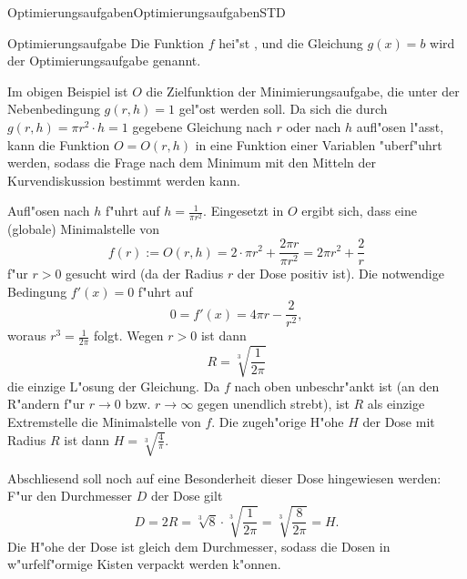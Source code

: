 \begin{MXContent}{Optimierungsaufgaben}{Optimierungsaufgaben}{STD}
\begin{MXInfo}{Optimierungsaufgabe}
Die Funktion $f$ hei"st , und die 
Gleichung $g(x) = b$ wird  der 
Optimierungsaufgabe genannt.
\end{MXInfo}

Im obigen Beispiel ist $O$ die Zielfunktion der Minimierungsaufgabe, die 
unter der Nebenbedingung $g(r, h) = 1$ gel"ost werden soll. Da sich die 
durch $g(r, h) = \pi r^2 \cdot h = 1$ gegebene Gleichung nach $r$ oder nach 
$h$ aufl"osen l"asst, kann die Funktion $O = O(r, h)$ in eine Funktion einer 
Variablen "uberf"uhrt werden, sodass die Frage nach dem Minimum mit den Mitteln 
der Kurvendiskussion %
bestimmt werden kann.

Aufl"osen nach $h$ f"uhrt auf $h = \frac{1}{\pi r^2}$. Eingesetzt in $O$ 
ergibt sich, dass eine (globale) Minimalstelle von
\[
f(r) := O(r, h) = 2 \cdot \pi r^2 + \frac{2 \pi r}{\pi r^2} %
 = 2 \pi r^2 + \frac{2}{r} %
\]
f"ur $r > 0$ gesucht wird (da der Radius $r$ der Dose positiv ist).
Die notwendige Bedingung $f'(x) = 0$ f"uhrt auf
\[
0 = f'(x) = 4 \pi r - \frac{2}{r^2}, %
\]
woraus $r^3 = \frac{1}{2 \pi}$ folgt. Wegen $r > 0$ ist dann
\[
R = \sqrt[3]{\frac{1}{2 \pi}} %
\]
die einzige L"osung der Gleichung. Da $f$ nach oben unbeschr"ankt ist 
(an den R"andern f"ur $r \to 0$ bzw. $r \to \infty$ gegen {\glqq}unendlich 
strebt{\grqq}), ist $R$ als einzige Extremstelle die Minimalstelle von $f$.
%
Die zugeh"orige H"ohe $H$ der Dose mit Radius $R$ ist dann
$H = \sqrt[3]{\frac{4}{\pi}}$.

Abschliesend soll noch auf eine Besonderheit dieser Dose hingewiesen werden:
F"ur den Durchmesser $D$ der Dose gilt
\[
D = 2 R = \sqrt[3]{8} \cdot \sqrt[3]{\frac{1}{2 \pi}} %
 = \sqrt[3]{\frac{8}{2 \pi}} = H. %
\]
Die H"ohe der Dose ist gleich dem Durchmesser, sodass die Dosen in 
w"urfelf"ormige Kisten verpackt werden k"onnen.
\end{MXContent}



